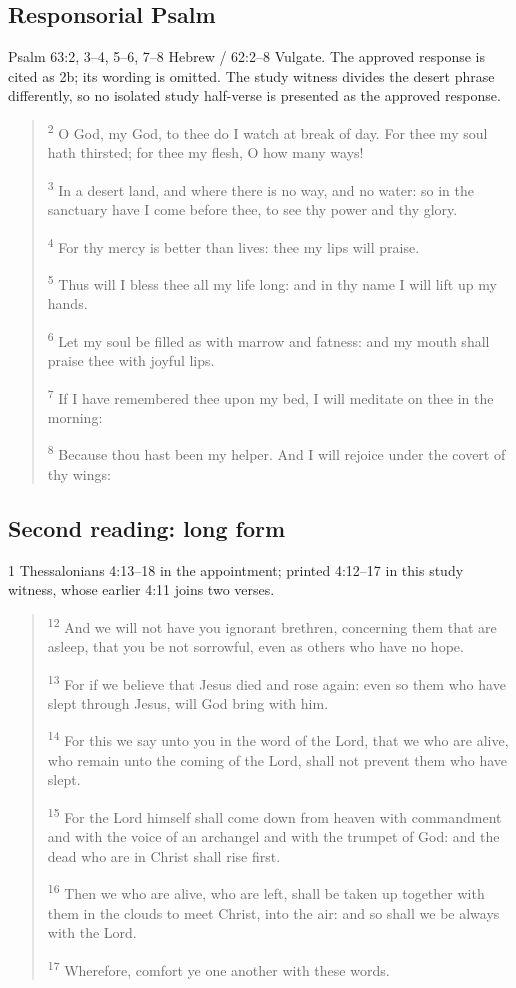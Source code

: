 \subsection{Responsorial Psalm}
\label{proper-psalm}
Psalm 63:2, 3--4, 5--6, 7--8 Hebrew / 62:2--8 Vulgate. The approved response is cited as 2b; its wording is omitted. The study witness divides the desert phrase differently, so no isolated study half-verse is presented as the approved response.

\begin{quote}
\textsuperscript{2} O God, my God, to thee do I watch at break of day. For thee my soul hath thirsted; for thee my flesh, O how many ways!

\textsuperscript{3} In a desert land, and where there is no way, and no water: so in the sanctuary have I come before thee, to see thy power and thy glory.

\textsuperscript{4} For thy mercy is better than lives: thee my lips will praise.

\textsuperscript{5} Thus will I bless thee all my life long: and in thy name I will lift up my hands.

\textsuperscript{6} Let my soul be filled as with marrow and fatness: and my mouth shall praise thee with joyful lips.

\textsuperscript{7} If I have remembered thee upon my bed, I will meditate on thee in the morning:

\textsuperscript{8} Because thou hast been my helper. And I will rejoice under the covert of thy wings:
\end{quote}


\subsection{Second reading: long form}
\label{proper-second-reading-long}
1 Thessalonians 4:13--18 in the appointment; printed 4:12--17 in this study witness, whose earlier 4:11 joins two verses.

\begin{quote}
\textsuperscript{12} And we will not have you ignorant brethren, concerning them that are asleep, that you be not sorrowful, even as others who have no hope.

\textsuperscript{13} For if we believe that Jesus died and rose again: even so them who have slept through Jesus, will God bring with him.

\textsuperscript{14} For this we say unto you in the word of the Lord, that we who are alive, who remain unto the coming of the Lord, shall not prevent them who have slept.

\textsuperscript{15} For the Lord himself shall come down from heaven with commandment and with the voice of an archangel and with the trumpet of God: and the dead who are in Christ shall rise first.

\textsuperscript{16} Then we who are alive, who are left, shall be taken up together with them in the clouds to meet Christ, into the air: and so shall we be always with the Lord.

\textsuperscript{17} Wherefore, comfort ye one another with these words.
\end{quote}



